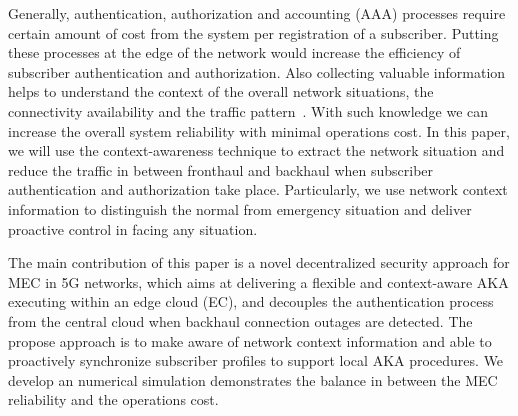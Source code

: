 \documentclass{ieeeaccess}
\newcommand{\change}[1]{#1}
\begin{document}
	Generally, authentication, authorization and accounting (AAA) processes require certain amount of cost from the system per registration of a subscriber. Putting these processes at the edge of the network would increase the efficiency of subscriber authentication and authorization. Also collecting valuable information helps to understand the context of the overall network situations, the connectivity availability and the traffic pattern~\cite{klein2010access}. With such knowledge we can increase the overall system reliability with minimal operations cost. In this paper, we will use the context-awareness technique to extract the network situation and reduce the traffic in between \change{fronthaul} and \change{backhaul} when subscriber authentication and authorization take place. Particularly, we use network context information to distinguish the normal from emergency situation and deliver proactive control in facing any situation.
	
	\change{The main contribution of this paper is a novel decentralized security approach for MEC in 5G networks, which aims at delivering a flexible and context-aware AKA executing within an edge cloud (EC), and decouples the authentication process from the central cloud when backhaul connection outages are detected. The propose approach is to make aware of network context information and able to proactively synchronize subscriber profiles to support local AKA procedures. We develop an numerical simulation demonstrates the balance in between the MEC reliability and the operations cost.}
	
\end{document}
